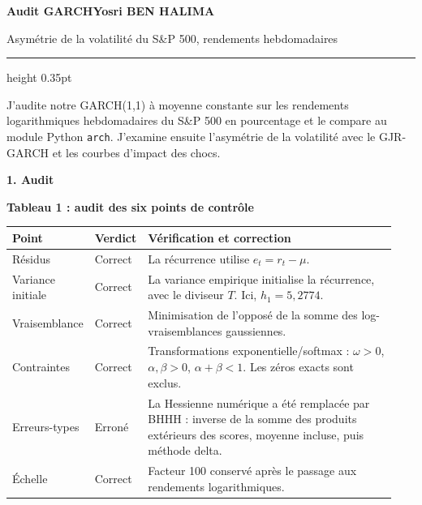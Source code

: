 \documentclass[10pt,a4paper]{article}
\newcommand{\sectionline}[1]{\vspace{4pt}\textbf{#1}\par}
\begin{document}
{\Large\bfseries Audit GARCH}\hfill {\small\bfseries Yosri BEN HALIMA}\par
{\small Asymétrie de la volatilité du S\&P 500, rendements hebdomadaires}\par
\vspace{3pt}\hrule height 0.35pt\vspace{5pt}

J'audite notre GARCH(1,1) à moyenne constante sur les rendements logarithmiques
hebdomadaires du S\&P 500 en pourcentage et le compare au module Python \texttt{arch}.
J'examine ensuite l'asymétrie de la volatilité avec le GJR-GARCH et les courbes d'impact des chocs.

\sectionline{1. Audit}
\begin{center}
\small
\renewcommand{\arraystretch}{1.08}
\textbf{Tableau 1 : audit des six points de contrôle}\par
\begin{tabular}{@{}p{0.18\linewidth}p{0.09\linewidth}p{0.67\linewidth}@{}}
\toprule
Point & Verdict & Vérification et correction \\
\midrule
Résidus & Correct & La récurrence utilise $e_t=r_t-\mu$. \\
Variance initiale & Correct & La variance empirique initialise la récurrence, avec le diviseur $T$. Ici, $h_1=5{,}2774$. \\
Vraisemblance & Correct & Minimisation de l'opposé de la somme des log-vraisemblances gaussiennes. \\
Contraintes & Correct & Transformations exponentielle/softmax : $\omega>0$, $\alpha,\beta>0$, $\alpha+\beta<1$. Les zéros exacts sont exclus. \\
Erreurs-types & Erroné & La Hessienne numérique a été remplacée par BHHH : inverse de la somme des produits extérieurs des scores, moyenne incluse, puis méthode delta. \\
Échelle & Correct & Facteur 100 conservé après le passage aux rendements logarithmiques. \\
\bottomrule
\end{tabular}
\par\vspace{2pt}{\footnotesize Les verdicts portent sur le code initial. La comparaison utilise la version corrigée.}
\end{center}
\end{document}
